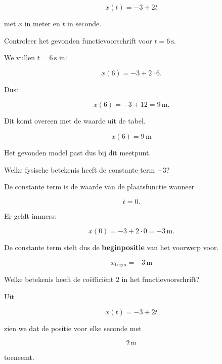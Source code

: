 \documentclass{ximera}
\begin{document}
\begin{oefening}{\oefU\ESS}
\begin{question}
\begin{oplossing}
  \[
  \boxed{x(t)=-3+2t}
  \]
  
  met $x$ in meter en $t$ in seconde.
  \end{oplossing}
  \end{question}
  
  
  \begin{question}
  Controleer het gevonden functievoorschrift voor $t=6\,\mathrm{s}$.
  
  \begin{oplossing}
  We vullen $t=6\,\mathrm{s}$ in:
  
  \[
  x(6)
  =
  -3+2\cdot 6.
  \]
  
  Dus:
  
  \[
  x(6)
  =
  -3+12
  =
  9\,\mathrm{m}.
  \]
  
  Dit komt overeen met de waarde uit de tabel.
  
  \[
  \boxed{x(6)=9\,\mathrm{m}}
  \]
  
  Het gevonden model past dus bij dit meetpunt.
  \end{oplossing}
  \end{question}
  
  
  \begin{question}
  Welke fysische betekenis heeft de constante term $-3$?
  
  \begin{oplossing}
  De constante term is de waarde van de plaatsfunctie wanneer
  
  \[
  t=0.
  \]
  
  Er geldt immers:
  
  \[
  x(0)
  =
  -3+2\cdot0
  =
  -3\,\mathrm{m}.
  \]
  
  De constante term stelt dus de \textbf{beginpositie} van het voorwerp voor.
  
  \[
  \boxed{x_{\text{begin}}=-3\,\mathrm{m}}
  \]
  \end{oplossing}
  \end{question}
  
  
  \begin{question}
  Welke betekenis heeft de coëfficiënt $2$ in het functievoorschrift?
  
  \begin{oplossing}
  Uit
  
  \[
  x(t)=-3+2t
  \]
  
  zien we dat de positie voor elke seconde met
  
  \[
  2\,\mathrm{m}
  \]
  
  toeneemt.
  

\end{oplossing}
\end{question}
\end{oefening}
\end{document}
